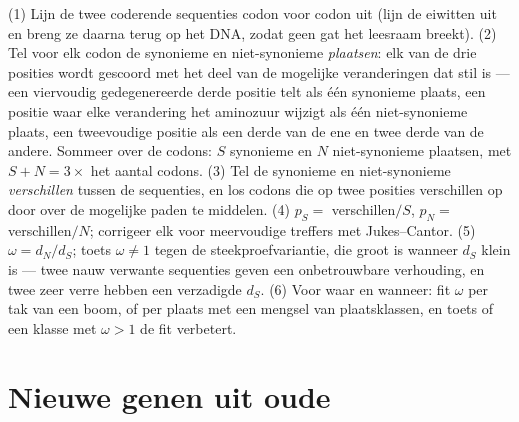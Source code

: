 \begin{method}[$d_{N}/d_{S}$ schatten]\label{met:b3:molecular-evolution:method}
(1) Lijn de twee coderende sequenties codon voor codon uit (lijn de
eiwitten uit en breng ze daarna terug op het DNA, zodat geen gat het
leesraam breekt). (2) Tel voor elk codon de synonieme en niet-synonieme
\emph{plaatsen}: elk van de drie posities wordt gescoord met het deel
van de mogelijke veranderingen dat stil is --- een viervoudig
gedegenereerde derde positie telt als één synonieme plaats, een positie
waar elke verandering het aminozuur wijzigt als één niet-synonieme
plaats, een tweevoudige positie als een derde van de ene en twee derde
van de andere. Sommeer over de codons: $S$ synonieme en $N$
niet-synonieme plaatsen, met $S + N = 3 \times$ het aantal codons.
(3) Tel de synonieme en niet-synonieme \emph{verschillen} tussen de
sequenties, en los codons die op twee posities verschillen op door over
de mogelijke paden te middelen. (4) $p_{S} = $ verschillen$/S$,
$p_{N} = $ verschillen$/N$; corrigeer elk voor meervoudige treffers met
Jukes--Cantor. (5) $\omega =
d_{N}/d_{S}$; toets $\omega \ne 1$ tegen de steekproefvariantie, die
groot is wanneer $d_{S}$ klein is --- twee nauw verwante sequenties
geven een onbetrouwbare verhouding, en twee zeer verre hebben een
verzadigde $d_{S}$. (6) Voor waar en wanneer: fit $\omega$ per tak van
een boom, of per plaats met een mengsel van plaatsklassen, en toets of
een klasse met $\omega > 1$ de fit verbetert.
\end{method}

\section{Nieuwe genen uit oude}

